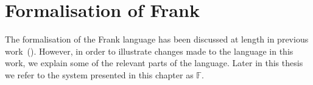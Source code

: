 \documentclass[msc,deptreport,cs]{infthesis} %
\newcommand{\code}[1]{\lstinline{#1}}
\newcommand\purefrank{$\mathbb{F}$}
\begin{document}


\chapter{Formalisation of Frank}
\label{chap:formalisation}

The formalisation of the Frank language has been discussed at length in previous
work~(\cite{convent2020doo}). However, in order to illustrate changes made to
the language in this work, we explain some of the relevant parts of the
language. Later in this thesis we refer to the system presented in this chapter as \purefrank.
\end{document}
